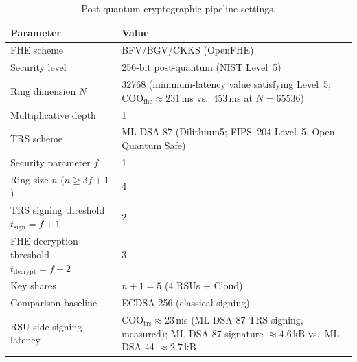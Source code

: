 \documentclass[12pt, a4paper]{report}
\begin{document}
\begin{table}[H]
\centering
\caption{Post-quantum cryptographic pipeline settings.}
\label{tab:set-pqc}
\renewcommand{\arraystretch}{1.15}
\begin{tabular}{|p{5.2cm}|p{8.8cm}|}
\hline
\textbf{Parameter} & \textbf{Value} \\
\hline
FHE scheme                         & BFV/BGV/CKKS (OpenFHE)~\cite{mamun2025postquantum} \\
\hline
Security level                     & 256-bit post-quantum (NIST Level~5) \\
\hline
Ring dimension $N$                 & 32768 (minimum-latency value satisfying
                                     Level~5; $\mathrm{COO}_{\mathrm{fhe}}\approx231$\,ms
                                     vs.\ 453\,ms at $N{=}65536$)~\cite{mamun2025postquantum} \\
\hline
Multiplicative depth               & 1 \\
\hline
TRS scheme                         & ML-DSA-87 (Dilithium5; FIPS~204 Level~5,
                                     Open Quantum Safe) \\
\hline
Security parameter $f$             & 1 \\
\hline
Ring size $n$ ($n\geq 3f{+}1$)     & 4 \\
\hline
TRS signing threshold $t_{\mathrm{sign}}=f{+}1$ & 2 \\
\hline
FHE decryption threshold $t_{\mathrm{decrypt}}=f{+}2$ & 3 \\
\hline
Key shares                         & $n+1=5$ (4 RSUs + Cloud) \\
\hline
Comparison baseline                & ECDSA-256 (classical signing) \\
\hline
RSU-side signing latency           & $\mathrm{COO}_{\mathrm{trs}}\approx23$\,ms
                                     (ML-DSA-87 TRS signing, measured);
                                     ML-DSA-87 signature ${\approx}4.6$\,kB
                                     vs.\ ML-DSA-44 ${\approx}2.7$\,kB \\
\hline
\end{tabular}
\end{table}
\end{document}
